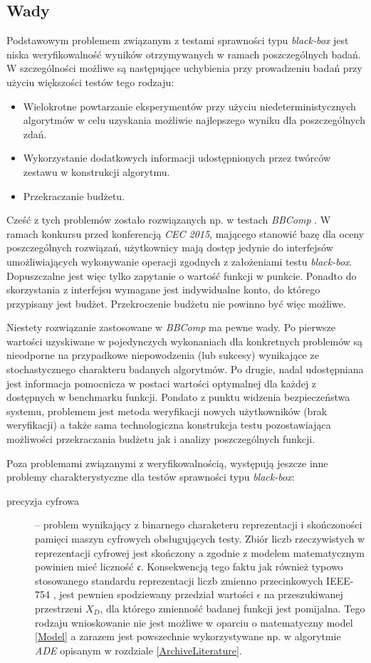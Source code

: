 \documentclass[12pt,a4paper]{report}
\begin{document}
{{{{\subsection{Wady}
\label{WadyBB}
\par{
Podstawowym problemem związanym z testami sprawności typu \emph{black-box} jest niska weryfikowalność wyników otrzymywanych w ramach poszczególnych badań. W szczególności możliwe są następujące uchybienia przy prowadzeniu badań przy użyciu większości testów tego rodzaju:
\begin{itemize}
\item Wielokrotne powtarzanie eksperymentów przy użyciu niedeterministycznych algorytmów w celu uzyskania możliwie najlepszego wyniku dla poszczególnych zdań.
\item Wykorzystanie dodatkowych informacji udostępnionych przez twórców zestawu w konstrukcji algorytmu.
\item Przekraczanie budżetu.
\end{itemize}
Cześć z tych problemów zostało rozwiązanych np. w testach \emph{BBComp} \cite{BBComp}. W ramach konkursu przed konferencją \emph{CEC 2015}, mającego stanowić bazę dla oceny poszczególnych rozwiązań, użytkownicy mają dostęp jedynie do interfejsów umożliwiających wykonywanie operacji zgodnych z założeniami testu \emph{black-box}. Dopuszczalne jest więc tylko zapytanie o wartość funkcji w punkcie. Ponadto do skorzystania z interfejsu wymagane jest indywidualne konto, do którego przypisany jest budżet. Przekroczenie budżetu nie powinno być więc możliwe.
}
\par{
Niestety rozwiązanie zastosowane w \emph{BBComp} ma pewne wady. Po pierwsze wartości uzyskiwane w pojedynczych wykonaniach dla konkretnych problemów są nieodporne na przypadkowe niepowodzenia (lub sukcesy) wynikające ze stochastycznego charakteru badanych algorytmów.
Po drugie, nadal udostępniana jest informacja pomocnicza w postaci wartości optymalnej dla każdej z dostępnych w benchmarku funkcji. Pondato z punktu widzenia bezpieczeństwa systemu, problemem jest metoda weryfikacji nowych użytkowników (brak weryfikacji) a także sama technologiczna konstrukcja testu pozostawiająca możliwości przekraczania budżetu jak i analizy poszczególnych funkcji.
}
\par{
Poza problemami związanymi z weryfikowalnością, występują jeszcze inne problemy charakterystyczne dla testów sprawności typu \emph{black-box}:
\begin{description}
\item[precyzja cyfrowa] -- problem wynikający z binarnego charaketeru reprezentacji i skończoności pamięci maszyn cyfrowych obsługujących testy. Zbiór liczb rzeczywistych w reprezentacji cyfrowej jest skończony a zgodnie z modelem matematycznym powinien mieć liczność $\mathfrak{c}$. Konsekwencją tego faktu jak również typowo stosowanego standardu reprezentacji liczb zmienno przecinkowych IEEE-754 \cite{IEEE754}, jest pewnien spodziewany przedział wartości $\epsilon$ na przeszukiwanej przestrzeni $X_D$, dla którego zmienność badanej funkcji jest pomijalna. Tego rodzaju wnioskowanie nie jest możliwe w oparciu o matematyczny model \ref{Model} a zarazem jest powszechnie wykorzystywane np. w algorytmie \emph{ADE} opisanym w rozdziale \ref{ArchiveLiterature}.

\end{description}}}}}}
\end{document}
